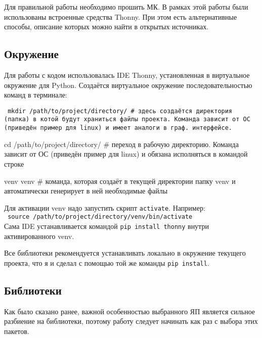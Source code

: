 Для правильной работы необходимо прошить МК. В рамках этой работы были использованы встроенные средства Thonny. При этом есть альтернативные способы, описание которых можно найти в открытых источниках.

\subsection{Окружение}
Для работы с кодом использовалась IDE Thonny, установленная в виртуальное окружение для Python. Создаётся виртуальное окружение последовательностью команд в терминале:

{\tt
    \noindent\hangindent=5mm
    mkdir /path/to/project/directory/ \# здесь создаётся директория (папка) в котой будут храниться файлы проекта. Команда зависит от ОС (приведён пример для linux) и имеет аналоги в граф. интерфейсе.

    \noindent\hangindent=5mm
    cd /path/to/project/directory/ \# переход в рабочую директорию. Команда зависит от ОС (приведён пример для linux) и обязана исполняться в командой строке

    \noindent\hangindent=5mm
    venv venv \# команда, которая создаёт в текущей директории папку venv и автоматически генерирует в ней необходимые файлы

}
\noindent Для активации venv надо запустить скрипт \texttt{activate}. Например:\\
\texttt{
    source /path/to/project/directory/venv/bin/activate
}\\
Сама IDE устанавливается командой \texttt{pip install thonny} внутри активированного venv.

Все библиотеки рекомендуется устанавливать локально в окружение текущего проекта, что я и сделал с помощью той же команды \texttt{pip install}.

\subsection{Библиотеки}
Как было сказано ранее, важной особенностью выбранного ЯП является сильное разбиение на библиотеки, поэтому работу следует начинать как раз с выбора этих пакетов.

